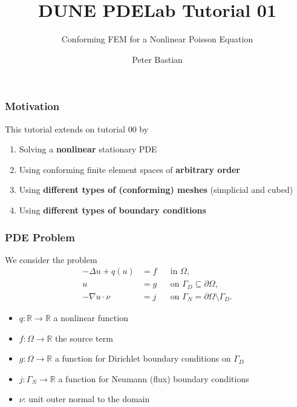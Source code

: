 \documentclass[aspectratio=169,11pt]{beamer}
\title{DUNE PDELab Tutorial 01}
\subtitle{Conforming FEM for a Nonlinear Poisson Equation}
\author{Peter Bastian}
\institute[]
{
  IWR\\
  Heidelberg University
}
\theoremstyle{definition}
\begin{document}


\begin{frame}
\frametitle{Motivation}
This tutorial extends on tutorial 00 by
\begin{enumerate}[1)]
\item Solving a \textbf{nonlinear} stationary PDE
\item Using conforming finite element spaces of \textbf{arbitrary order}
\item Using \textbf{different types of (conforming) meshes} (simplicial and cubed)
\item Using \textbf{different types of boundary conditions}
\end{enumerate}
\end{frame}

\begin{frame}
\frametitle{PDE Problem}
We consider the problem
\begin{subequations} \label{eq:ProblemStrong}
\begin{align}
-\Delta u + q(u) &= f &&\text{in $\Omega$},\\
u &= g &&\text{on $\Gamma_D\subseteq\partial\Omega$},\\
-\nabla u\cdot \nu &= j &&\text{on $\Gamma_N=\partial\Omega\setminus\Gamma_D$}.
\end{align}
\end{subequations}
\begin{itemize}
\item $q:\mathbb{R}\to\mathbb{R}$ a nonlinear function
\item $f: \Omega\to\mathbb{R}$ the source term
\item $g: \Omega\to\mathbb{R}$ a function for Dirichlet boundary conditions on $\Gamma_D$
\item $j : \Gamma_N\to\mathbb{R}$ a function for Neumann (flux) boundary conditions
\item $\nu$: unit outer normal to the domain
\end{itemize}
\end{frame}
\end{document}
